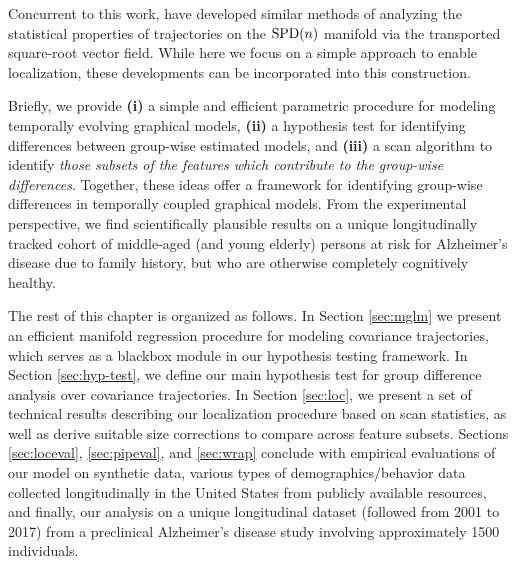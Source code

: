 

Concurrent to this work, \cite{su2014statistical,zhang2018rate} have developed similar methods of analyzing the statistical properties of trajectories on the $\text{SPD}(n)$ manifold via the transported square-root vector field. While here we focus on a simple approach to enable localization, these developments can be incorporated into this construction.

Briefly, we provide \textbf{(i)} a simple and efficient parametric procedure for modeling temporally evolving graphical models, \textbf{(ii)} a 
hypothesis test for identifying differences between group-wise estimated models, and \textbf{(iii)} a scan
algorithm to identify {\em those subsets of the features which contribute to the group-wise differences}.
Together, these ideas offer a framework for identifying group-wise differences in temporally coupled graphical models.
From the experimental perspective, we find scientifically plausible results on 
a unique longitudinally tracked cohort of middle-aged (and young elderly) persons at risk for Alzheimer's disease due to family history, 
but who are otherwise completely cognitively healthy.

The rest of this chapter is organized as follows. In Section \ref{sec:mglm} we present an efficient manifold regression procedure for 
modeling covariance trajectories, which serves as a blackbox module in our hypothesis testing framework. 
In Section \ref{sec:hyp-test}, we define our main hypothesis test for group difference analysis over covariance trajectories. 
In Section \ref{sec:loc}, we present a set of technical results describing our localization procedure based on scan statistics, 
as well as derive suitable size corrections to compare across feature subsets. Sections \ref{sec:loceval}, \ref{sec:pipeval}, and \ref{sec:wrap} conclude with
empirical evaluations of our model on synthetic data, various types of demographics/behavior data collected longitudinally 
in the United States from publicly available resources, and finally, our 
analysis on a unique longitudinal dataset (followed from 2001 to 2017) from a preclinical Alzheimer's disease study involving approximately 1500 individuals.
